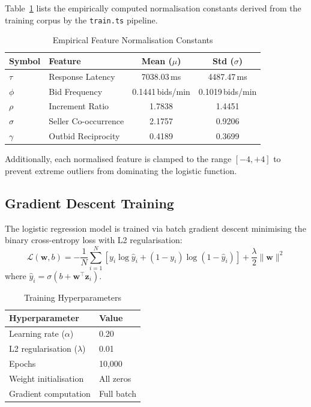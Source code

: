\documentclass[11pt]{article}
\begin{document}
Table~\ref{tab:zscore} lists the empirically computed normalisation
constants derived from the training corpus by the \texttt{train.ts}
pipeline.

\begin{table}[ht]
\centering
\caption{Empirical Feature Normalisation Constants}
\label{tab:zscore}
\begin{tabular}{llcc}
\toprule
\textbf{Symbol} & \textbf{Feature} & \textbf{Mean ($\mu$)} & \textbf{Std ($\sigma$)} \\
\midrule
$\tau$ & Response Latency & 7038.03\,ms & 4487.47\,ms \\
$\phi$ & Bid Frequency & 0.1441\,bids/min & 0.1019\,bids/min \\
$\rho$ & Increment Ratio & 1.7838 & 1.4451 \\
$\sigma$ & Seller Co-occurrence & 2.1757 & 0.9206 \\
$\gamma$ & Outbid Reciprocity & 0.4189 & 0.3699 \\
\bottomrule
\end{tabular}
\end{table}

Additionally, each normalised feature is clamped to the range $[-4, +4]$
to prevent extreme outliers from dominating the logistic function.

\subsection{Gradient Descent Training}

The logistic regression model is trained via batch gradient descent
minimising the binary cross-entropy loss with L2 regularisation:
\begin{equation}
    \mathcal{L}(\mathbf{w}, b) = -\frac{1}{N}\sum_{i=1}^{N}
    \left[ y_i \log \hat{y}_i + (1 - y_i) \log(1 - \hat{y}_i) \right]
    + \frac{\lambda}{2} \|\mathbf{w}\|^2
\end{equation}
where $\hat{y}_i = \sigma(b + \mathbf{w}^\top \mathbf{z}_i)$.

\begin{table}[ht]
\centering
\caption{Training Hyperparameters}
\label{tab:hyperparams}
\begin{tabular}{ll}
\toprule
\textbf{Hyperparameter} & \textbf{Value} \\
\midrule
Learning rate ($\alpha$) & 0.20 \\
L2 regularisation ($\lambda$) & 0.01 \\
Epochs & 10,000 \\
Weight initialisation & All zeros \\
Gradient computation & Full batch \\
\bottomrule
\end{tabular}
\end{table}
\end{document}
